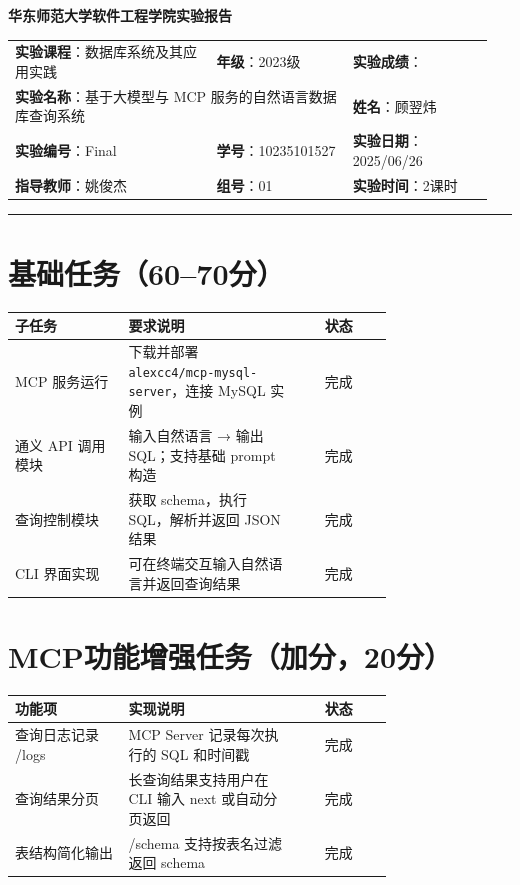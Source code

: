 \documentclass{article}
\begin{document}
	\begin{center}
		{\Large{\textbf{\heiti 华东师范大学软件工程学院实验报告}}}
		\begin{table}[htb]
			\flushleft
			\begin{tabular}{p{0.4\linewidth}p{0.27\linewidth}p{0.28\linewidth}}\\
				\textbf{实验课程}：数据库系统及其应用实践  & \textbf{年级}：2023级       & \textbf{实验成绩}：  \\
				\multicolumn{2}{l}{\textbf{实验名称}：基于大模型与 MCP 服务的自然语言数据库查询系统}  & \textbf{姓名}：顾翌炜                    \\
				\textbf{实验编号}：Final     & \textbf{学号}：10235101527 & \textbf{实验日期}：2025/06/26  \\
				\textbf{指导教师}：姚俊杰     & \textbf{组号}：01            & \textbf{实验时间}：2课时  \\ 
			\end{tabular}
		\end{table}
		
		\rule{\textwidth}{2pt}
	\end{center}
	
	\section*{基础任务（60--70分）}
	
	\begin{tabular}{|p{0.3\linewidth}|p{0.45\linewidth}|c|}
		\hline
		子任务 & 要求说明 & 状态 \\ \hline
		MCP 服务运行 & 下载并部署 \texttt{alexcc4/mcp-mysql-server}，连接 MySQL 实例 & 完成 \\ \hline
		通义 API 调用模块 & 输入自然语言 → 输出 SQL；支持基础 prompt 构造 & 完成 \\ \hline
		查询控制模块 & 获取 schema，执行 SQL，解析并返回 JSON 结果 & 完成 \\ \hline
		CLI 界面实现 & 可在终端交互输入自然语言并返回查询结果 & 完成 \\ \hline
	\end{tabular}
	
	\section*{MCP功能增强任务（加分，20分）}
	
	\begin{tabular}{|p{0.3\linewidth}|p{0.45\linewidth}|c|}
		\hline
		功能项 & 实现说明 & 状态 \\ \hline
		查询日志记录 /logs & MCP Server 记录每次执行的 SQL 和时间戳 & 完成 \\ \hline
		查询结果分页 & 长查询结果支持用户在 CLI 输入 next 或自动分页返回 & 完成 \\ \hline
		表结构简化输出 & /schema 支持按表名过滤返回 schema & 完成 \\ \hline
	\end{tabular}
	
\end{document}
